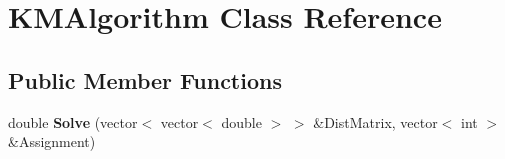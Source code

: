 \hypertarget{classKMAlgorithm}{}\section{K\+M\+Algorithm Class Reference}
\label{classKMAlgorithm}
\subsection*{Public Member Functions}
\begin{DoxyCompactItemize}
\item 
\mbox{\label{classKMAlgorithm_a56acc6197c8977d5928a0d3543658fb8}} 
double {\bfseries Solve} (vector$<$ vector$<$ double $>$ $>$ \&Dist\+Matrix, vector$<$ int $>$ \&Assignment)
\end{DoxyCompactItemize}
